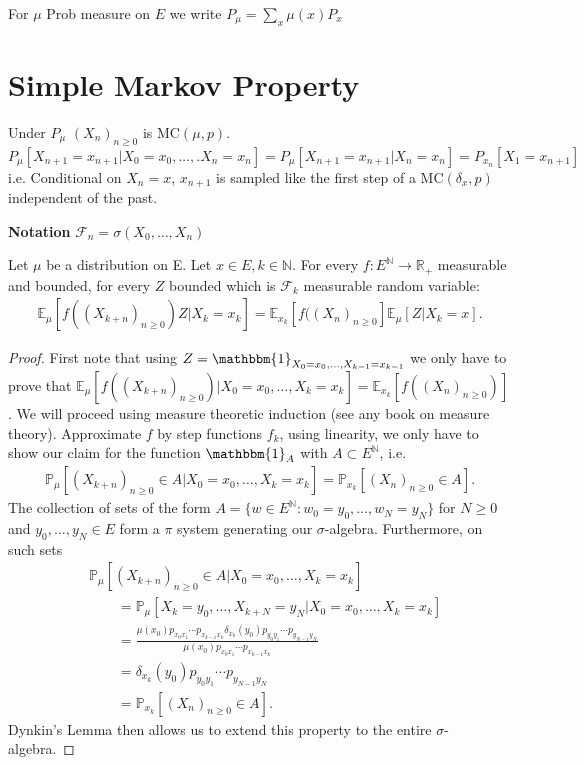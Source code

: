 For $\mu$ Prob measure on $E $ we write $P_\mu= \sum_{x}\mu(x)P_x$

\section{Simple Markov Property}
Under $P_\mu$ $(X_n)_{n \geq 0}$ is $ \textrm{MC}(\mu, p)$.
$P_\mu [X_{n+1}=x_{n+1} | X_0 = x_0, \ldots ,.X_n=x_n] = P_\mu[X_{n+1}=x_{n+1}| X_n = x_n] = P_{x_n}[X_1 =x_{n+1}]$ i.e. Conditional on $X_n=x$, $x_{n+1}$ is sampled like the first step of a $ \textrm{MC}(\delta_{x},p)$ independent of the past.

\textbf{Notation} $ \mathcal{F}_n = \sigma(X_0, \ldots ,X_n)$ 

\begin{theorem}
	Let $\mu$ be a distribution on E. Let $x \in E, k \in \mathbb{N}$. For every $f: E^{\mathbb{N}} \to \mathbb{R}_+$ measurable and bounded, for every $Z$ bounded which is $ \mathcal{F}_k$ measurable random variable:
\begin{align}
	\boxed{	\mathbb{E}_\mu \left[ f((X_{k+n})_{n \geq 0})Z | X_k = x_k \right] = \mathbb{E}_{x_k} \left[ f((X_n)_{n \geq 0} \right] \mathbb{E}_\mu \left[ Z | X_k=x \right] }. 
\end{align}
\end{theorem}
\begin{proof}
	First note that using $Z= \mathbbm{1}_{X_0=x_0, \ldots ,X_{k-1}=x_{k-1}}$ we only have to prove that \newline $\mathbb{E}_{\mu } \left[ f((X_{k+n})_{n\geq 0}) | X_0=x_0 , \ldots , X_k=x_k \right]= \mathbb{E}_{x_k} \left[ f((X_n)_{n\geq 0}) \right]$. We will proceed using measure theoretic induction (see any book on measure theory). Approximate $f$ by step functions $f_k$, using linearity, we only have to show our claim for the function $\mathbbm{1}_{A} $ with $A \subset E ^{\mathbb{N}}$, i.e. 
	\begin{align}
	\mathbb{P}_{\mu } \left[ (X_{k+n})_{n\geq 0}\in A | X_0=x_0, \ldots ,X_k=x_k \right] = \mathbb{P}_{x_k} \left[ (X_n)_{n\geq 0} \in A \right] 
.\end{align}  
The collection of sets of the form $A=\{w \in E^{\mathbb{N}}: w_0=y_0, \ldots ,w_N=y_N\}$ for $N\geq 0$ and $y_0, \ldots ,y_N \in E$ form a $\pi $ system generating our $\sigma$-algebra. Furthermore, on such sets 
\begin{align}
&	\mathbb{P}_{\mu } \left[ (X_{k+n})_{n\geq 0}\in A | X_0 = x_0, \ldots ,X_k=x_k \right] \\
&\qquad= \mathbb{P}_{\mu} \left[ X_k=y_0, \ldots ,X_{k+N}= y_N | X_0=x_0, \ldots ,X_k=x_k  \right] \\
&\qquad= \frac{\mu (x_0) p_{x_0x_1} \cdots p_{x_{k-1}x_k} \delta_{x_k}(y_0)p_{y_0y_1} \cdots p_{y_{N-1}y_N}}{\mu (x_0) p_{x_0x_1} \cdots p_{x_{k-1}x_k} } \\
& \qquad= \delta_{x_k}(y_0)p_{y_0y_1} \cdots p_{y_{N-1}y_N} \\
& \qquad= \mathbb{P}_{x_k} \left[ (X_n)_{n\geq 0} \in A \right] 
.\end{align}
Dynkin's Lemma then allows us to extend this property to the entire $\sigma$-algebra.
\end{proof}


